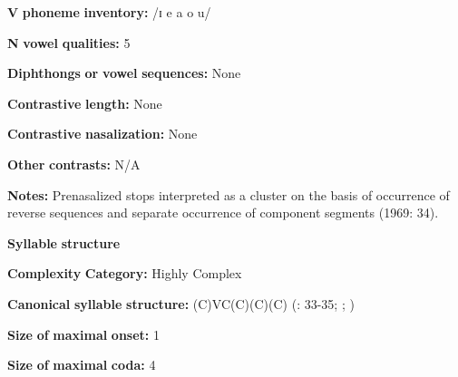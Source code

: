 \documentclass[output=paper]{langsci/langscibook}
\begin{document}
\begin{styleBody}
\textbf{V} \textbf{phoneme} \textbf{inventory:} /ɪ e a o u/
\end{styleBody}

\begin{styleBody}
\textbf{N} \textbf{vowel} \textbf{qualities:} 5
\end{styleBody}

\begin{styleBody}
\textbf{Diphthongs} \textbf{or} \textbf{vowel} \textbf{sequences:} None
\end{styleBody}

\begin{styleBody}
\textbf{Contrastive} \textbf{length:} None
\end{styleBody}

\begin{styleBody}
\textbf{Contrastive} \textbf{nasalization:} None
\end{styleBody}

\begin{styleBody}
\textbf{Other} \textbf{contrasts:} N/A
\end{styleBody}

\begin{styleBody}
\textbf{Notes:} Prenasalized stops interpreted as a cluster on the basis of occurrence of reverse sequences and separate occurrence of component segments (1969: 34).
\end{styleBody}

\begin{styleBody}
\textbf{Syllable} \textbf{structure}
\end{styleBody}

\begin{styleBody}
\textbf{Complexity} \textbf{Category:} Highly Complex
\end{styleBody}

\begin{styleBody}
\textbf{Canonical} \textbf{syllable} \textbf{structure:} (C)VC(C)(C)(C) (\citealt{Summer1969}: 33-35; \citealt{Sommer1981}; \citealt{Dixon1970})
\end{styleBody}

\begin{styleBody}
\textbf{Size} \textbf{of} \textbf{maximal} \textbf{onset:} 1
\end{styleBody}

\begin{styleBody}
\textbf{Size} \textbf{of} \textbf{maximal} \textbf{coda:} 4
\end{styleBody}
\end{document}
